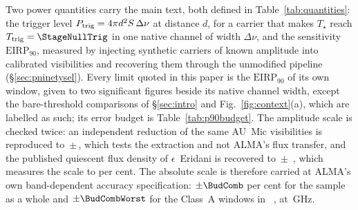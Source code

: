 Two power quantities carry the main text, both defined in
Table~\ref{tab:quantities}: the trigger level $P_{\rm trig} = 4\pi
d^{2}S\,\Delta\nu$ at distance $d$, for a carrier that makes $T_\star$ reach
$T_{\rm trig}=\StageNullTrig$ in one native channel of width $\Delta\nu$, and
the sensitivity $\mathrm{EIRP}_{90}$, measured by injecting synthetic carriers
of known amplitude into calibrated visibilities and recovering them through
the unmodified pipeline (\S\ref{sec:pninetysel}). Every limit quoted in this
paper is the $\mathrm{EIRP}_{90}$ of its own window, given to two significant
figures beside its native channel width, except the bare-threshold comparisons
of \S\ref{sec:intro} and Fig.~\ref{fig:context}(a), which are labelled as
such; its error budget is Table~\ref{tab:p90budget}. The amplitude scale is
checked twice: an independent reduction of the same AU~Mic visibilities is
reproduced to \PxJanRatio\,$\pm$\,\PxJanRatioErr, which tests the extraction
and not ALMA's flux transfer, and the published quiescent flux density of
$\epsilon$~Eridani is recovered to \PxEpsRatio\,$\pm$\,\PxEpsRatioErr{}
\citep{Burton2022}, which measures the scale to \SbEpsPct{} per cent. The
absolute scale is therefore carried at ALMA's own band-dependent accuracy
specification: $\pm\BudComb$ per cent for the sample as a whole and
$\pm\BudCombWorst$ for the \BudNHiWin{} Class~A windows in
\BudHiBandWord~\BudHiBands, at \BudHiGHzList\,GHz.

